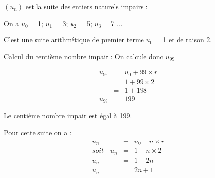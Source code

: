 \begin{myex}
	$(u_n)$ est la suite des entiers naturels impairs :
	
	On a $u_0$ = 1; $u_1$ = 3; $u_2$ = 5; $u_3$ = 7 ...
	
	C'est une suite arithmétique de premier terme $u_0$ = 1 et de raison 2.
	
	Calcul du centième nombre impair :
	 On calcule donc $u_{99}$
	 
	 \begin{eqnarray*}
	 	u_{99} & = & u_0 + 99 \times r \\
				& = & 1 + 99 \times 2 \\
				& = & 1 + 198 \\
		u_{99}	& = & 199	 	
	 \end{eqnarray*}
 
 Le centième nombre impair est égal à 199.
 
 
 Pour cette suite on a :
	 \begin{eqnarray*}
	 	 u_{n} & = & u_0 + n \times r \\
		soit \quad u_n & = & 1 + n \times 2 \\
	 	 u_n & = & 1 + 2n \\
	 	 u_{n}	& = & 2n + 1	 	
	 \end{eqnarray*}
 
\end{myex}